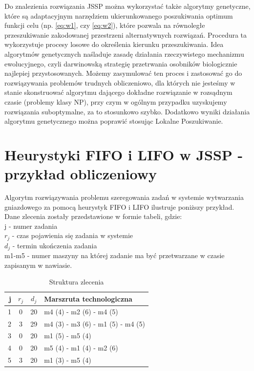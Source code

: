 \documentclass[twoside]{kInzynierka}
\begin{document}
Do znalezienia rozwiązania JSSP można wykorzystać także algorytmy genetyczne, które są adaptacyjnym narzędziem ukierunkowanego poszukiwania optimum funkcji celu (np. \ref{eq:w1}, czy \ref{eq:w2}), które pozwala na równoległe przeszukiwanie zakodowanej przestrzeni alternatywnych rozwiązań. Procedura ta wykorzystuje procesy losowe do określenia kierunku przeszukiwania. Idea algorytmów genetycznych naśladuje zasadę działania rzeczywistego mechanizmu ewolucyjnego, czyli darwinowską strategię przetrwania osobników biologicznie najlepiej przystosowanych. Możemy zasymulować ten proces i zastosować go do rozwiązywania problemów trudnych obliczeniowo, dla których nie jesteśmy w stanie skonstruować algorytmu dającego dokładne rozwiązanie w rozsądnym czasie (problemy klasy NP), przy czym w ogólnym przypadku uzyskujemy rozwiązania suboptymalne, za to stosunkowo szybko. Dodatkowo wyniki działania algorytmu genetycznego można poprawić stosując Lokalne Poszukiwanie. \cite{grzechca} \cite{genetyczne}

\section        [Heurystyki FIFO i LIFO \ldots]
                {Heurystyki FIFO i LIFO w JSSP \newlineTekst - przykład obliczeniowy}
Algorytm rozwiązywania problemu szeregowania zadań w systemie wytwarzania gniazdowego za pomocą heurystyk FIFO i LIFO ilustruje poniższy przykład. Dane zlecenia zostały przedstawione w formie tabeli, gdzie: \\
j - numer zadania \\
\(r_j\) - czas pojawienia się zadania w systemie \\
\(d_j\) - termin ukończenia zadania \\
m1-m5 - numer maszyny na której zadanie ma być przetwarzane w czasie zapisanym w nawiasie.
\begin{table}[htb]
	\centering
	\begin{tabular}{ | r | c | c | l | }
	\hline
	j	& \(r_j\)	& \(d_j\)	& Marszruta technologiczna	\\ \hline
	1	& 0	& 20	& m4 (4) - m2 (6) - m4 (5)	\\ \hline
	2	& 3	& 29	& m4 (3) - m3 (6) - m1 (5) - m4 (5)	\\ \hline
	3	& 0	& 20	& m1 (5) - m5 (4)	\\ \hline
	4	& 0	& 20	& m5 (4) - m1 (4) - m2 (6)	\\ \hline
	5	& 3	& 20	& m1 (3) - m5 (4)	\\ \hline
	\end{tabular}
	\caption{Struktura zlecenia}
\end{table}
\end{document}
